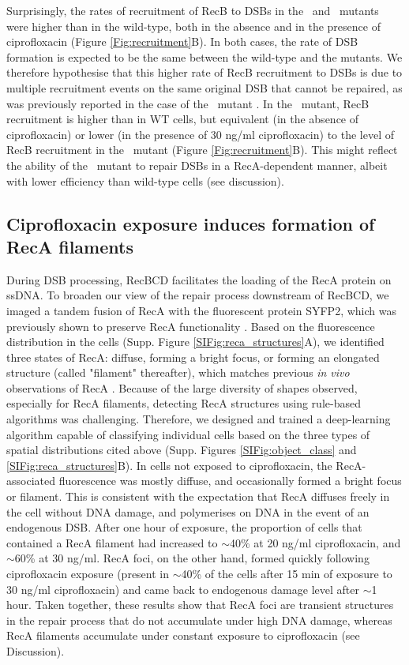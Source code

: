 Surprisingly, the rates of recruitment of RecB to DSBs in the \dreca\ and \geneteneighty\ mutants were higher than in the wild-type, both in the absence and in the presence of ciprofloxacin (Figure \ref{Fig:recruitment}B). In both cases, the rate of DSB formation is expected to be the same between the wild-type and the mutants. We therefore hypothesise that this higher rate of RecB recruitment to DSBs is due to multiple recruitment events on the same original DSB that cannot be repaired, as was previously reported in the case of the \dreca\ mutant \cite{Capaldo1975,Skarstad1993}. In the \geneteneighty\ mutant, RecB recruitment is higher than in WT cells, but equivalent (in the absence of ciprofloxacin) or lower (in the presence of 30 ng/ml ciprofloxacin) to the level of RecB recruitment in the \dreca\ mutant (Figure \ref{Fig:recruitment}B). This might reflect the ability of the \geneteneighty\ mutant to repair DSBs in a RecA-dependent manner, albeit with lower efficiency than wild-type cells (see discussion).

\subsection*{Ciprofloxacin exposure induces formation of RecA filaments}
During DSB processing, RecBCD facilitates the loading of the RecA protein on ssDNA. To broaden our view of the repair process down\-stream of RecBCD, we imaged a tandem fusion of RecA with the fluorescent protein SYFP2, which was previously shown to preserve RecA functionality \cite{Wiktor2021}. Based on the fluorescence distribution in the cells (Supp. Figure \ref{SIFig:reca_structures}A), we identified three states of RecA: diffuse, forming a bright focus, or forming an elongated structure (called "filament" thereafter), which matches previous \emph{in vivo} observations of RecA \cite{Wiktor2021}. Because of the large diversity of shapes observed, especially for RecA filaments, detecting RecA structures using rule-based algorithms was challenging. Therefore, we designed and trained a deep-learning algorithm capable of classifying individual cells based on the three types of spatial distributions cited above (Supp. Figures \ref{SIFig:object_class} and \ref{SIFig:reca_structures}B). In cells not exposed to ciprofloxacin, the RecA-associated fluorescence was mostly diffuse, and occasionally formed a bright focus or filament. This is consistent with the expectation that RecA diffuses freely in the cell without DNA damage, and polymerises on DNA in the event of an endogenous DSB. After one hour of exposure, the proportion of cells that contained a RecA filament had increased to $\sim$40\% at 20 ng/ml ciprofloxacin, and $\sim$60\% at 30 ng/ml. RecA foci, on the other hand, formed quickly following ciprofloxacin exposure (present in $\sim$40\% of the cells after 15 min of exposure to 30 ng/ml ciprofloxacin) and came back to endogenous damage level after $\sim$1 hour. Taken together, these results show that RecA foci are transient structures in the repair process that do not accumulate under high DNA damage, whereas RecA filaments accumulate under constant exposure to ciprofloxacin (see Discussion).

